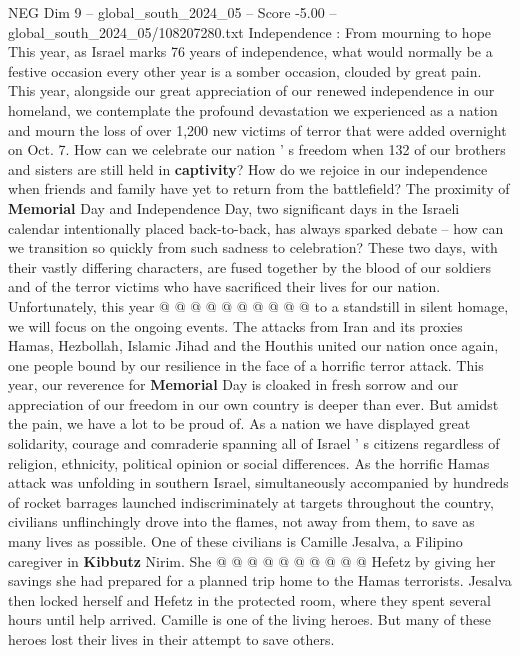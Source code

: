 \begin{textsample}{NEG Dim 9 – global\_south\_2024\_05 – Score -5.00 – global\_south\_2024\_05/108207280.txt}  \label{ex:f9_neg_404}
Independence : From mourning to hope This year, as Israel marks 76 years of independence, what would normally be a festive occasion every other year is a somber occasion, clouded by great pain.
This year, alongside our great appreciation of our renewed independence in our homeland, we contemplate the profound devastation we experienced as a nation and mourn the loss of over 1,200 new victims of terror that were added overnight on Oct. 7.
How can we celebrate our nation ' s freedom when 132 of our brothers and sisters are still held in \textbf{captivity}?
How do we rejoice in our independence when friends and family have yet to return from the battlefield?
The proximity of \textbf{Memorial} Day and Independence Day, two significant days in the Israeli calendar intentionally placed back-to-back, has always sparked debate -- how can we transition so quickly from such sadness to celebration?
These two days, with their vastly differing characters, are fused together by the blood of our soldiers and of the terror victims who have sacrificed their lives for our nation.
Unfortunately, this year @ @ @ @ @ @ @ @ @ @ to a standstill in silent homage, we will focus on the ongoing events.
The attacks from Iran and its proxies Hamas, Hezbollah, Islamic Jihad and the Houthis united our nation once again, one people bound by our resilience in the face of a horrific terror attack.
This year, our reverence for \textbf{Memorial} Day is cloaked in fresh sorrow and our appreciation of our freedom in our own country is deeper than ever.
But amidst the pain, we have a lot to be proud of.
As a nation we have displayed great solidarity, courage and comraderie spanning all of Israel ' s citizens regardless of religion, ethnicity, political opinion or social differences.
As the horrific Hamas attack was unfolding in southern Israel, simultaneously accompanied by hundreds of rocket barrages launched indiscriminately at targets throughout the country, civilians unflinchingly drove into the flames, not away from them, to save as many lives as possible.
One of these civilians is Camille Jesalva, a Filipino caregiver in \textbf{Kibbutz} Nirim.
She @ @ @ @ @ @ @ @ @ @ Hefetz by giving her savings she had prepared for a planned trip home to the Hamas terrorists.
Jesalva then locked herself and Hefetz in the protected room, where they spent several hours until help arrived.
Camille is one of the living heroes.
But many of these heroes lost their lives in their attempt to save others.

\end{textsample}
